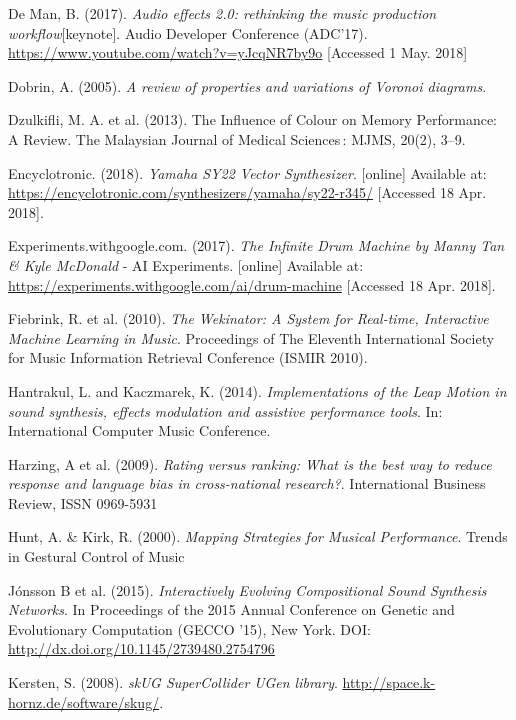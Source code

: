 \documentclass[11pt, oneside]{report}   	%
\begin{document}
{\begin{thebibliography}{9}
De Man, B. (2017). \emph{Audio effects 2.0: rethinking the music production workflow}[keynote]. Audio Developer Conference (ADC'17). \url{https://www.youtube.com/watch?v=yJcqNR7by9o}  [Accessed 1  May. 2018]

Dobrin, A. (2005). \emph{A review of properties and variations of Voronoi diagrams}. 

Dzulkifli, M. A. et al. (2013). The Influence of Colour on Memory Performance: A Review. The Malaysian Journal of Medical Sciences : MJMS, 20(2), 3–9.

Encyclotronic. (2018). \emph{Yamaha SY22 Vector Synthesizer}. [online] Available at: \url{https://encyclotronic.com/synthesizers/yamaha/sy22-r345/} [Accessed 18 Apr. 2018].

Experiments.withgoogle.com. (2017). \emph{The Infinite Drum Machine by Manny Tan \& Kyle McDonald} - AI Experiments. [online] Available at: \url{https://experiments.withgoogle.com/ai/drum-machine} [Accessed 18 Apr. 2018].

Fiebrink, R. et al. (2010). \emph{The Wekinator: A System for Real-time, Interactive Machine Learning in Music}. Proceedings of The Eleventh International Society for Music Information Retrieval Conference (ISMIR 2010). 

Hantrakul, L. and Kaczmarek, K. (2014). \emph{Implementations of the Leap Motion in sound synthesis, effects modulation and assistive performance tools}. In: International Computer Music Conference. 

Harzing, A et al. (2009). \emph{Rating versus ranking: What is the best way to reduce response and language bias in cross-national research?}.
International Business Review,
ISSN 0969-5931

Hunt, A. \& Kirk, R. (2000). \emph{Mapping Strategies for Musical Performance}. Trends in Gestural Control of Music

J\'{o}nsson B et al. (2015). \emph{Interactively Evolving Compositional Sound Synthesis Networks}. In Proceedings of the 2015 Annual Conference on Genetic and Evolutionary Computation (GECCO '15), New York. DOI: \url{http://dx.doi.org/10.1145/2739480.2754796}

Kersten, S. (2008). \emph{skUG SuperCollider UGen library}. \url{http://space.k- hornz.de/software/skug/}.


\end{thebibliography}}
\end{document}
